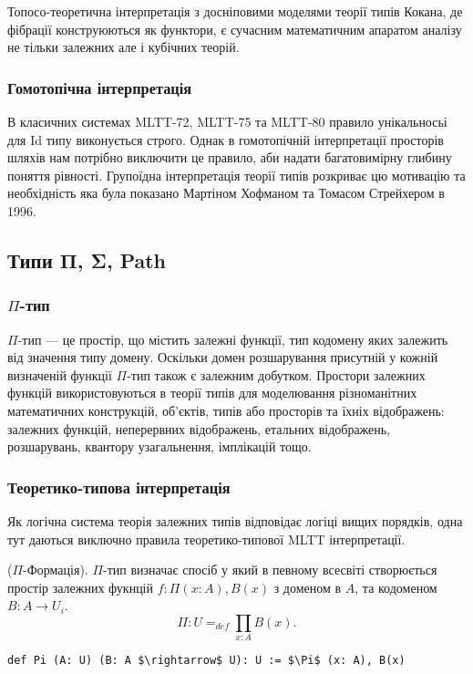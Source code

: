 Топосо-теоретична інтерпретація з досніповими моделями теорії типів Кокана,
де фібрації конструюються як функтори, є сучасним математичним апаратом
аналізу не тільки залежних але і кубічних теорій.

\subsubsection{Гомотопічна інтерпретація}
В класичних системах MLTT-72, MLTT-75 та MLTT-80 правило унікальносьі для
Id типу виконується строго. Однак в гомотопічній інтерпретації просторів шляхів
нам потрібно виключити це правило, аби надати багатовимірну глибину поняття рівності.
Групоїдна інтерпретація теорії типів розкриває цю мотивацію та необхідність яка
була показано Мартіном Хофманом та Томасом Стрейхером в 1996.

\newpage
\subsection{Типи Π, Σ, Path}

\subsubsection{$\Pi$-тип}
$\Pi$-тип --- це простір, що містить залежні функції, тип кодомену
яких залежить від значення типу домену. Оскільки домен розшарування
присутній у кожній визначеній функції $\Pi$-тип також є залежним добутком.
Простори залежних функцій використовуються в теорії типів для моделювання
різноманітних математичних конструкцій, об’єктів, типів або
просторів та їхніх відображень: залежних функцій, неперервних відображень,
етальних відображень, розшарувань, квантору узагальнення, імплікацій тощо.

\subsubsection*{Теоретико-типова інтерпретація}
Як логічна система теорія залежних типів відповідає логіці вищих порядків,
одна тут даються виключно правила теоретико-типової MLTT інтерпретації.

\begin{definition} ($\Pi$-Формація). $\Pi$-тип визначає спосіб у який
в певному всесвіті створюється простір залежних фукнцій $f: \Pi(x:A), B(x)$ з
доменом в $A$, та кодоменом $B: A \rightarrow U_i$.
$$\Pi : U =_{def} \prod_{x:A}B(x).$$
\begin{lstlisting}
def Pi (A: U) (B: A $\rightarrow$ U): U := $\Pi$ (x: A), B(x)
\end{lstlisting}
\end{definition}

